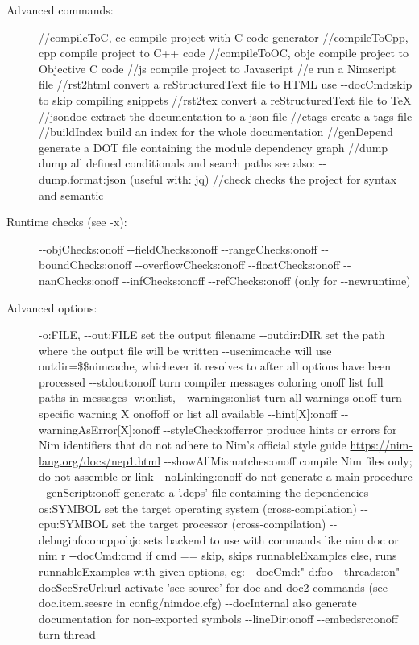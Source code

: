 \begin{description}
\item[Advanced commands:]
//compileToC, cc compile project with C code generator //compileToCpp,
cpp compile project to C++ code //compileToOC, objc compile project to
Objective C code //js compile project to Javascript //e run a Nimscript
file //rst2html convert a reStructuredText file to HTML use
{-\/-docCmd:skip} to skip compiling snippets //rst2tex convert a
reStructuredText file to TeX //jsondoc extract the documentation to a
json file //ctags create a tags file //buildIndex build an index for the
whole documentation //genDepend generate a DOT file containing the
module dependency graph //dump dump all defined conditionals and search
paths see also: -\/-dump.format:json (useful with: { \textbar{} jq})
//check checks the project for syntax and semantic
\item[Runtime checks (see -x):]
-\/-objChecks:onoff -\/-fieldChecks:onoff -\/-rangeChecks:onoff
-\/-boundChecks:onoff -\/-overflowChecks:onoff -\/-floatChecks:onoff
-\/-nanChecks:onoff -\/-infChecks:onoff -\/-refChecks:onoff (only for
-\/-newruntime)
\item[Advanced options:]
-o:FILE, -\/-out:FILE set the output filename -\/-outdir:DIR set the
path where the output file will be written -\/-usenimcache will use
{outdir=\$\$nimcache}, whichever it resolves to after all options have
been processed -\/-stdout:onoff turn compiler messages coloring onoff
list full paths in messages -w:onlist, -\/-warnings:onlist turn all
warnings onoff turn specific warning X onoffoff or list all available
-\/-hint{[}X{]}:onoff -\/-warningAsError{[}X{]}:onoff
-\/-styleCheck:offerror produce hints or errors for Nim identifiers that
do not adhere to Nim's official style guide
\url{https://nim-lang.org/docs/nep1.html} -\/-showAllMismatches:onoff
compile Nim files only; do not assemble or link -\/-noLinking:onoff do
not generate a main procedure -\/-genScript:onoff generate a '.deps'
file containing the dependencies -\/-os:SYMBOL set the target operating
system (cross-compilation) -\/-cpu:SYMBOL set the target processor
(cross-compilation) -\/-debuginfo:oncppobjc sets backend to use with
commands like {nim doc} or {nim r} -\/-docCmd:cmd if {cmd == skip},
skips runnableExamples else, runs runnableExamples with given options,
eg: {-\/-docCmd:"-d:foo -\/-threads:on"} -\/-docSeeSrcUrl:url activate
'see source' for doc and doc2 commands (see doc.item.seesrc in
config/nimdoc.cfg) -\/-docInternal also generate documentation for
non-exported symbols -\/-lineDir:onoff -\/-embedsrc:onoff turn thread

\end{description}
